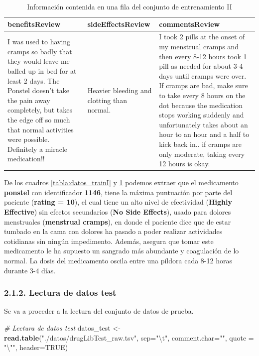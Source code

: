 \documentclass[spanish,]{article}
\newenvironment{Shaded}{\begin{snugshade}}{\end{snugshade}}
\newcommand{\KeywordTok}[1]{\textcolor[rgb]{0.13,0.29,0.53}{\textbf{#1}}}
\newcommand{\DataTypeTok}[1]{\textcolor[rgb]{0.13,0.29,0.53}{#1}}
\newcommand{\CharTok}[1]{\textcolor[rgb]{0.31,0.60,0.02}{#1}}
\newcommand{\StringTok}[1]{\textcolor[rgb]{0.31,0.60,0.02}{#1}}
\newcommand{\CommentTok}[1]{\textcolor[rgb]{0.56,0.35,0.01}{\textit{#1}}}
\newcommand{\OtherTok}[1]{\textcolor[rgb]{0.56,0.35,0.01}{#1}}
\newcommand{\NormalTok}[1]{#1}
\begin{document}
\begin{table}[h]
  \centering
    \begin{tabular}{|m{5cm}|m{3cm}|m{7cm}|}
      \hline
      \rowcolor[rgb]{0.94,0.97,1.0} \textbf{benefitsReview} & \textbf{sideEffectsReview} & \textbf{commentsReview} \\ \hline
      I was used to having cramps so badly that they would leave me balled up in bed for at least 2 days. The Ponstel doesn't take the pain away completely, but takes the edge off so much that normal activities were possible. Definitely a miracle medication!! & Heavier bleeding and clotting than normal. & I took 2 pills at the onset of my menstrual cramps and then every 8-12 hours took 1 pill as needed for about 3-4 days until cramps were over. If cramps are bad, make sure to take every 8 hours on the dot because the medication stops working suddenly and unfortunately takes about an hour to an hour and a half to kick back in.. if cramps are only moderate, taking every 12 hours is okay. \\ \hline
    \end{tabular}
  \caption{Información contenida en una fila del conjunto de entrenamiento II}
  \label{tabla:datos_trainII}
\end{table}

De los cuadros \ref{tabla:datos_trainI} y \ref{tabla:datos_trainII}
podemos extraer que el medicamento \textbf{ponstel} con identificador
\textbf{1146}, tiene la máxima puntuación por parte del paciente
(\textbf{rating = 10}), el cual tiene un alto nivel de efectividad
(\textbf{Highly Effective}) sin efectos secundarios
(\textbf{No Side Effects}), usado para dolores menstruales
(\textbf{menstrual cramps}), en donde el paciente dice que de estar
tumbado en la cama con dolores ha pasado a poder realizar actividades
cotidianas sin ningún impedimento. Además, asegura que tomar este
medicamento le ha supuesto un sangrado más abundante y coagulación de lo
normal. La dosis del medicamento oscila entre una píldora cada 8-12
horas durante 3-4 días.

\subsubsection{2.1.2. Lectura de datos
test}\label{lectura-de-datos-test}

Se va a proceder a la lectura del conjunto de datos de prueba.

\begin{Shaded}
\begin{Highlighting}[]
\CommentTok{# Lectura de datos test}
\NormalTok{datos_test <-}\StringTok{ }\KeywordTok{read.table}\NormalTok{(}\StringTok{"./datos/drugLibTest_raw.tsv"}\NormalTok{, }\DataTypeTok{sep=}\StringTok{"}\CharTok{\textbackslash{}t}\StringTok{"}\NormalTok{, }\DataTypeTok{comment.char=}\StringTok{""}\NormalTok{,}
                         \DataTypeTok{quote =} \StringTok{"}\CharTok{\textbackslash{}"}\StringTok{"}\NormalTok{, }\DataTypeTok{header=}\OtherTok{TRUE}\NormalTok{)}
\end{Highlighting}
\end{Shaded}
\end{document}
